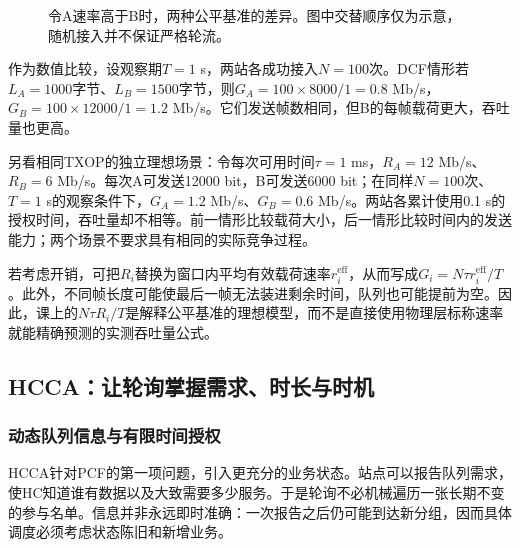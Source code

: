 \begin{figure}[htbp]
\centering
{}
\caption{令A速率高于B时，两种公平基准的差异。图中交替顺序仅为示意，随机接入并不保证严格轮流。}
\end{figure}

作为数值比较，设观察期$T=1$ s，两站各成功接入$N=100$次。DCF情形若$L_A=1000$字节、$L_B=1500$字节，则$G_A=100\times8000/1=0.8$ Mb/s，$G_B=100\times12000/1=1.2$ Mb/s。它们发送帧数相同，但B的每帧载荷更大，吞吐量也更高。

另看相同TXOP的独立理想场景：令每次可用时间$\tau=1$ ms，$R_A=12$ Mb/s、$R_B=6$ Mb/s。每次A可发送12000 bit，B可发送6000 bit；在同样$N=100$次、$T=1$ s的观察条件下，$G_A=1.2$ Mb/s、$G_B=0.6$ Mb/s。两站各累计使用0.1 s的授权时间，吞吐量却不相等。前一情形比较载荷大小，后一情形比较时间内的发送能力；两个场景不要求具有相同的实际竞争过程。

若考虑开销，可把$R_i$替换为窗口内平均有效载荷速率$r_i^{\mathrm{eff}}$，从而写成$G_i=N\tau r_i^{\mathrm{eff}}/T$。此外，不同帧长度可能使最后一帧无法装进剩余时间，队列也可能提前为空。因此，课上的$N\tau R_i/T$是解释公平基准的理想模型，而不是直接使用物理层标称速率就能精确预测的实测吞吐量公式。

\subsection{HCCA：让轮询掌握需求、时长与时机}

\subsubsection{动态队列信息与有限时间授权}

HCCA针对PCF的第一项问题，引入更充分的业务状态。站点可以报告队列需求，使HC知道谁有数据以及大致需要多少服务。于是轮询不必机械遍历一张长期不变的参与名单。信息并非永远即时准确：一次报告之后仍可能到达新分组，因而具体调度必须考虑状态陈旧和新增业务。

